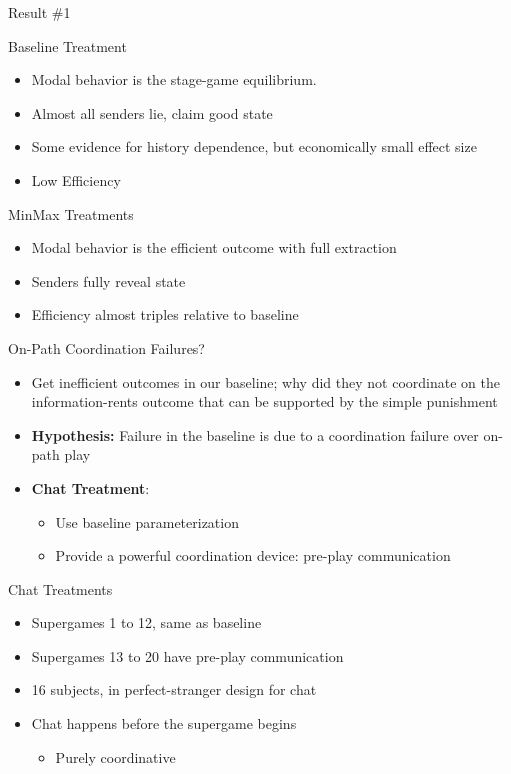 \documentclass{beamer}
\begin{document}
\begin{frame}{Result \#1}

Baseline Treatment 
\begin{itemize}
\item Modal behavior is the stage-game equilibrium.
\item Almost all senders lie, claim good state
\item Some evidence for history dependence, but economically small effect
size
\item Low Efficiency\bigskip{}
\end{itemize}
MinMax Treatments 
\begin{itemize}
\item Modal behavior is the efficient outcome with full extraction
\item Senders fully reveal state
\item Efficiency almost triples relative to baseline
\end{itemize}
\end{frame}
\begin{frame}{On-Path Coordination Failures?}
\begin{itemize}
\item Get inefficient outcomes in our baseline; why did they not coordinate
on the information-rents outcome that can be supported by the simple
punishment
\item \textbf{Hypothesis:} Failure in the baseline is due to a coordination
failure over on-path play\bigskip{}
\item \textbf{Chat Treatment}: 
\begin{itemize}
\item Use baseline parameterization
\item Provide a powerful coordination device: pre-play communication
\end{itemize}
\end{itemize}
\end{frame}

\begin{frame}{Chat Treatments}
\begin{itemize}
	\item Supergames 1 to 12, same as baseline
	\item Supergames 13 to 20 have pre-play communication
	\item 16 subjects, in perfect-stranger design for chat
	\item Chat happens before the supergame begins
	\begin{itemize}
		\item Purely coordinative
	\end{itemize}
\end{itemize}
\end{frame}
\end{document}
